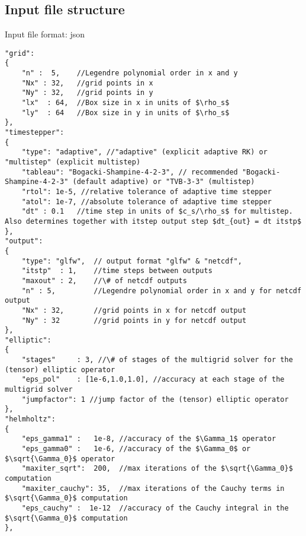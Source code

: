 \subsection{Input file structure}
Input file format: json
\begin{verbatim}
"grid":
{
    "n" :  5,    //Legendre polynomial order in x and y 
    "Nx" : 32,   //grid points in x
    "Ny" : 32,   //grid points in y
    "lx"  : 64,  //Box size in x in units of $\rho_s$
    "ly"  : 64   //Box size in y in units of $\rho_s$
},
"timestepper":
{
    "type": "adaptive", //"adaptive" (explicit adaptive RK) or "multistep" (explicit multistep)
    "tableau": "Bogacki-Shampine-4-2-3", // recommended "Bogacki-Shampine-4-2-3" (default adaptive) or "TVB-3-3" (multistep)
    "rtol": 1e-5, //relative tolerance of adaptive time stepper
    "atol": 1e-7, //absolute tolerance of adaptive time stepper
    "dt" : 0.1   //time step in units of $c_s/\rho_s$ for multistep. Also determines together with itstep output step $dt_{out} = dt itstp$
},
"output":
{
    "type": "glfw",  // output format "glfw" & "netcdf",
    "itstp"  : 1,    //time steps between outputs
    "maxout" : 2,    //\# of netcdf outputs
    "n" : 5,         //Legendre polynomial order in x and y for netcdf output
    "Nx" : 32,       //grid points in x for netcdf output
    "Ny" : 32        //grid points in y for netcdf output
},    
"elliptic":
{
    "stages"     : 3, //\# of stages of the multigrid solver for the (tensor) elliptic operator
    "eps_pol"    : [1e-6,1.0,1.0], //accuracy at each stage of the multigrid solver
    "jumpfactor": 1 //jump factor of the (tensor) elliptic operator
},
"helmholtz":
{
    "eps_gamma1" :   1e-8, //accuracy of the $\Gamma_1$ operator
    "eps_gamma0" :   1e-6, //accuracy of the $\Gamma_0$ or $\sqrt{\Gamma_0}$ operator
    "maxiter_sqrt":  200,  //max iterations of the $\sqrt{\Gamma_0}$ computation
    "maxiter_cauchy": 35,  //max iterations of the Cauchy terms in $\sqrt{\Gamma_0}$ computation
    "eps_cauchy" :  1e-12  //accuracy of the Cauchy integral in the $\sqrt{\Gamma_0}$ computation
},


\end{verbatim}
